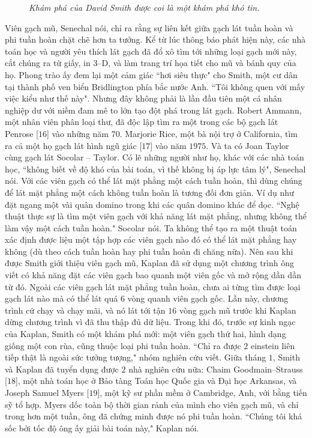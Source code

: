 \begin{multicols}{2}
\begin{figure}[H]
		\caption{\small\textit{\color{duongvaotoanhoc}Khám phá của David Smith được coi là một khám phá khó tin.}}
		\vspace*{-10pt}
	\end{figure}
	Viên gạch mũ, Senechal nói, chỉ ra rằng sự liên kết giữa gạch lát tuần hoàn và phi tuần hoàn chặt chẽ hơn ta tưởng.
	\vskip 0.1cm
	Kể từ lúc thông báo phát hiện này, các nhà toán học và người yêu thích lát gạch đã đổ xô tìm tới những loại gạch mới này, cắt chúng ra từ giấy, in $3$--D, và làm trang trí họa tiết cho mũ và bánh quy của họ. Phong trào ấy đem lại một cảm giác ``hơi siêu thực" cho Smith, một cư dân tại thành phố ven biển Bridlington phía bắc nước Anh. ``Tôi không quen với mấy việc kiểu như thế này".
	\vskip 0.1cm
	Nhưng đây không phải là lần đầu tiên một cá nhân nghiệp dư với niềm đam mê to lớn tạo đột phá trong lát gạch. Robert Ammann, một nhân viên phân loại thư, đã độc lập tìm ra một trong các bộ gạch lát Penrose [$16$] vào những năm $70$. Marjorie Rice, một bà nội trợ ở California, tìm ra cả một họ gạch lát hình ngũ giác [$17$] vào năm $1975$. Và ta có Joan Taylor cùng gạch lát Socolar -- Taylor. Có lẽ những người như họ, khác với các nhà toán học, ``không biết về độ khó của bài toán, vì thế không bị áp lực tâm lý", Senechal nói.
	\vskip 0.1cm
	Với các viên gạch có thể lát mặt phẳng một cách tuần hoàn, thì dùng chúng để lát mặt phẳng một cách không tuần hoàn là tương đối đơn giản. Ví dụ như đặt ngang một vài quân domino trong khi các quân domino khác để dọc. ``Nghệ thuật thực sự là tìm một viên gạch với khả năng lát mặt phẳng, nhưng không thể làm vậy một cách tuần hoàn." Socolar nói.
	\vskip 0.1cm
	Ta không thể tạo ra một thuật toán xác định được liệu một tập hợp các viên gạch nào đó có thể lát mặt phẳng hay không (dù theo cách tuần hoàn hay phi tuần hoàn đi chăng nữa). Nên sau khi được Smith giới thiệu viên gạch mũ, Kaplan đã sử dụng một chương trình ông viết có khả năng đặt các viên gạch bao quanh một viên gốc và mở rộng dần dần từ đó. Ngoài các viên gạch lát mặt phẳng tuần hoàn, chưa ai từng tìm được loại gạch lát nào mà có thể lát quá $6$ vòng quanh viên gạch gốc. Lần này, chương trình cứ chạy và chạy mãi, và nó lát tới tận $16$ vòng gạch mũ trước khi Kaplan dừng chương trình vì đã thu thập đủ dữ liệu.
	\vskip 0.1cm
	Trong khi đó, trước sự kinh ngạc của Kaplan, Smith có một khám phá mới: một viên gạch thứ hai, hình dạng giống một con rùa, cũng thuộc loại phi tuần hoàn. ``Chỉ ra được $2$ einstein liên tiếp thật là ngoài sức tưởng tượng," nhóm nghiên cứu viết.
	\vskip 0.1cm
	Giữa tháng $1$, Smith và Kaplan đã tuyển dụng được $2$ nhà nghiên cứu nữa: Chaim Goodmain--Strauss [$18$], một nhà toán học ở Bảo tàng Toán học Quốc gia và Đại học Arkansas, và Joseph Samuel Myers [$19$], một kỹ sư phần mềm ở Cambridge, Anh, với bằng tiến sỹ tổ hợp. Myers dốc toàn bộ thời gian rảnh của mình cho viên gạch mũ, và chỉ trong hơn một tuần, ông đã chứng minh được nó phi tuần hoàn. ``Chúng tôi khá sốc bởi tốc độ ông ấy giải bài toán này," Kaplan nói.

\end{multicols}
